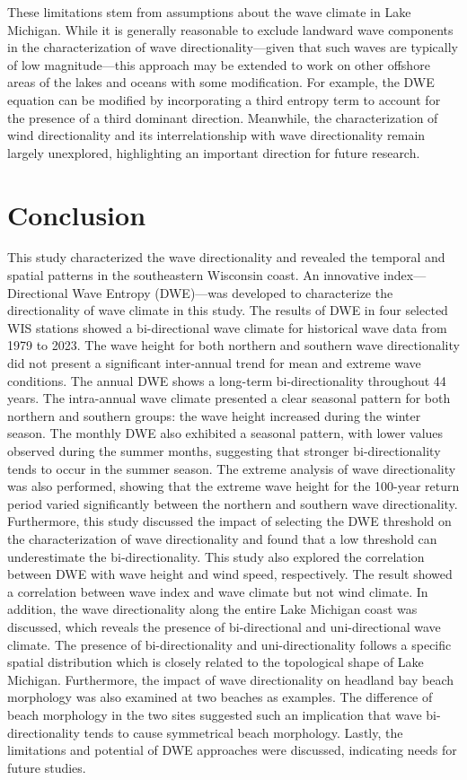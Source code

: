These limitations stem from assumptions about the wave climate in Lake Michigan.
While it is generally reasonable to exclude landward wave components in the
characterization of wave directionality—given that such waves are typically of
low magnitude—this approach may be extended to work on other offshore areas of
the lakes and oceans with some modification. For example, the DWE equation can
be modified by incorporating a third entropy term to account for the presence of
a third dominant direction. Meanwhile, the characterization of wind
directionality and its interrelationship with wave directionality remain largely
unexplored, highlighting an important direction for future research.

\section{Conclusion}
\label{c3_Conclusion}

This study characterized the wave directionality and revealed the temporal and
spatial patterns in the southeastern Wisconsin coast. An innovative
index—Directional Wave Entropy (DWE)—was developed to characterize the
directionality of wave climate in this study. The results of DWE in four
selected WIS stations showed a bi-directional wave climate for historical wave
data from 1979 to 2023. The wave height for both northern and southern wave
directionality did not present a significant inter-annual trend for mean and
extreme wave conditions. The annual DWE shows a long-term bi-directionality
throughout 44 years. The intra-annual wave climate presented a clear seasonal
pattern for both northern and southern groups: the wave height increased during
the winter season. The monthly DWE also exhibited a seasonal pattern, with lower
values observed during the summer months, suggesting that stronger
bi-directionality tends to occur in the summer season. The extreme analysis of
wave directionality was also performed, showing that the extreme wave height for
the 100-year return period varied significantly between the northern and
southern wave directionality. Furthermore, this study discussed the impact of
selecting the DWE threshold on the characterization of wave directionality and
found that a low threshold can underestimate the bi-directionality. This study
also explored the correlation between DWE with wave height and wind speed,
respectively. The result showed a correlation between wave index and wave
climate but not wind climate. In addition, the wave directionality along the
entire Lake Michigan coast was discussed, which reveals the presence of
bi-directional and uni-directional wave climate. The presence of
bi-directionality and uni-directionality follows a specific spatial distribution
which is closely related to the topological shape of Lake Michigan. Furthermore,
the impact of wave directionality on headland bay beach morphology was also
examined at two beaches as examples. The difference of beach morphology in the
two sites suggested such an implication that wave bi-directionality tends to
cause symmetrical beach morphology. Lastly, the limitations and potential of DWE
approaches were discussed, indicating needs for future studies.